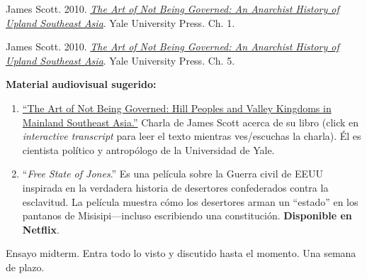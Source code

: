 \documentclass[letterpaper]{article}
\renewenvironment{itemize}{
  \begin{list}{}{
    \setlength{\leftmargin}{1.5em}
  }
}{
  \end{list}
}
\begin{document}
\begin{enumerate}[label=\roman*.]
\begin{itemize}
\begin{itemize}
          \item[$\circ$] James Scott. 2010. \href{https://github.com/hbahamonde/Ciencia_Politica_II/raw/master/Readings/Scott.pdf}{\emph{The Art of Not Being Governed: An Anarchist History of Upland Southeast Asia}}. Yale University Press. Ch. 1.

          
          \item[$\circ$] James Scott. 2010. \href{https://github.com/hbahamonde/Ciencia_Politica_II/raw/master/Readings/Scott.pdf}{\emph{The Art of Not Being Governed: An Anarchist History of Upland Southeast Asia}}. Yale University Press. Ch. 5.
					

                    \item[{\Pointinghand}] {\bf Material audiovisual sugerido:}
                  \begin{enumerate}
                    \item \href{https://www.cornell.edu/video/james-scott-the-art-of-not-being-governed}{``The Art of Not Being Governed: Hill Peoples and Valley Kingdoms in Mainland Southeast Asia.''} Charla de James Scott acerca de su libro (click en \emph{interactive transcript} para leer el texto mientras ves/escuchas la charla). \'El es cientista pol\'itico y antrop\'ologo de la Universidad de Yale. 

                    \item ``\emph{Free State of Jones}.'' Es una pel\'icula sobre la Guerra civil de EEUU inspirada en la verdadera historia de desertores confederados contra la esclavitud. La pel\'icula muestra c\'omo los desertores arman un ``estado'' en los pantanos de Misisipi---incluso escribiendo una constituci\'on. {\bf Disponible en Netflix}.
                  \end{enumerate}

        		\end{itemize}	






		\end{itemize}

\item[{\color{red}\Pointinghand}] Ensayo midterm. Entra todo lo visto y discutido hasta el momento. Una semana de plazo.



\end{enumerate}
\end{document}
